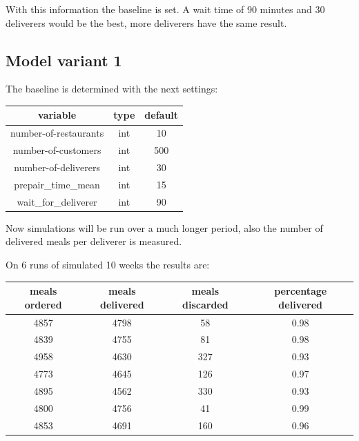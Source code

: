 With this information the baseline is set.
A wait time of 90 minutes and 30 deliverers would be the best, more deliverers have the same result.

\subsection{Model variant 1}
The baseline is determined with the next settings:
\begin{center}
    \begin{tabular}{ |c|c|c| }
        \hline
        variable              & type & default \\
        \hline
        \hline
        number-of-restaurants & int  & 10      \\
        \hline
        number-of-customers   & int  & 500     \\
        \hline
        number-of-deliverers  & int  & 30      \\
        \hline
        prepair\_time\_mean   & int  & 15      \\
        \hline
        wait\_for\_deliverer  & int  & 90      \\
        \hline
    \end{tabular}
\end{center}

Now simulations will be run over a much longer period, also the number of delivered meals per deliverer is measured.

On 6 runs of simulated 10 weeks the results are:

\begin{center}
    \begin{tabular}{ |c|c|c|c| }
        \hline
        meals ordered & meals delivered & meals discarded & percentage delivered \\
        \hline
        \hline
        4857          & 4798           & 58             & 0.98                 \\
        \hline
        4839          & 4755           & 81             & 0.98                 \\
        \hline
        4958          & 4630           & 327             & 0.93                 \\
        \hline
        4773          & 4645           & 126             & 0.97                 \\
        \hline
        4895          & 4562           & 330             & 0.93                 \\
        \hline
        4800          & 4756           & 41             & 0.99                 \\
        \hline
        \hline
        4853          & 4691           & 160             & 0.96 \\
    \end{tabular}
\end{center}

